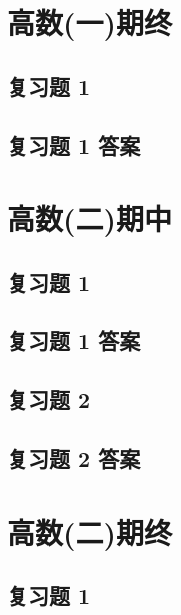 \documentclass[cn,11pt,fancy,hide]{elegantbook}
\begin{document}
\section{高数(一)期终}
\subsection{复习题 1}
\subsection{复习题 1 答案}




\section{高数(二)期中}
\subsection{复习题 1}
\subsection{复习题 1 答案}
\subsection{复习题 2}
\subsection{复习题 2 答案}




\section{高数(二)期终}
\subsection{复习题 1}
\end{document}
